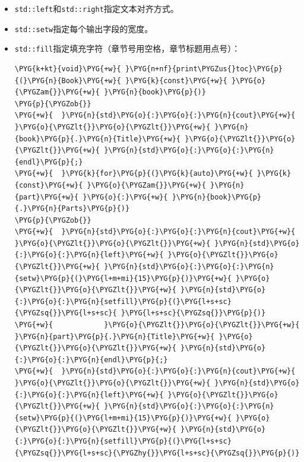 \begin{itemize}
\item \texttt{std::\allowbreak{}left}和\texttt{std::\allowbreak{}right}指定文本对齐方式。



\item \texttt{std::\allowbreak{}setw}指定每个输出字段的宽度。



\item \texttt{std::\allowbreak{}fill}指定填充字符（章节号用空格，章节标题用点号）：



\begin{codeblockbg}
\begin{Verbatim}[commandchars=\\\{\},breaklines=true,breakanywhere=true,fontsize=\codefont,xleftmargin=17bp]
\PYG{k+kt}{void}\PYG{+w}{ }\PYG{n+nf}{print\PYGZus{}toc}\PYG{p}{(}\PYG{n}{Book}\PYG{+w}{ }\PYG{k}{const}\PYG{+w}{ }\PYG{o}{\PYGZam{}}\PYG{+w}{ }\PYG{n}{book}\PYG{p}{)}
\PYG{p}{\PYGZob{}}
\PYG{+w}{  }\PYG{n}{std}\PYG{o}{:}\PYG{o}{:}\PYG{n}{cout}\PYG{+w}{ }\PYG{o}{\PYGZlt{}}\PYG{o}{\PYGZlt{}}\PYG{+w}{ }\PYG{n}{book}\PYG{p}{.}\PYG{n}{Title}\PYG{+w}{ }\PYG{o}{\PYGZlt{}}\PYG{o}{\PYGZlt{}}\PYG{+w}{ }\PYG{n}{std}\PYG{o}{:}\PYG{o}{:}\PYG{n}{endl}\PYG{p}{;}
\PYG{+w}{  }\PYG{k}{for}\PYG{p}{(}\PYG{k}{auto}\PYG{+w}{ }\PYG{k}{const}\PYG{+w}{ }\PYG{o}{\PYGZam{}}\PYG{+w}{ }\PYG{n}{part}\PYG{+w}{ }\PYG{o}{:}\PYG{+w}{ }\PYG{n}{book}\PYG{p}{.}\PYG{n}{Parts}\PYG{p}{)}
\PYG{p}{\PYGZob{}}
\PYG{+w}{  }\PYG{n}{std}\PYG{o}{:}\PYG{o}{:}\PYG{n}{cout}\PYG{+w}{ }\PYG{o}{\PYGZlt{}}\PYG{o}{\PYGZlt{}}\PYG{+w}{ }\PYG{n}{std}\PYG{o}{:}\PYG{o}{:}\PYG{n}{left}\PYG{+w}{ }\PYG{o}{\PYGZlt{}}\PYG{o}{\PYGZlt{}}\PYG{+w}{ }\PYG{n}{std}\PYG{o}{:}\PYG{o}{:}\PYG{n}{setw}\PYG{p}{(}\PYG{l+m+mi}{15}\PYG{p}{)}\PYG{+w}{ }\PYG{o}{\PYGZlt{}}\PYG{o}{\PYGZlt{}}\PYG{+w}{ }\PYG{n}{std}\PYG{o}{:}\PYG{o}{:}\PYG{n}{setfill}\PYG{p}{(}\PYG{l+s+sc}{\PYGZsq{}}\PYG{l+s+sc}{ }\PYG{l+s+sc}{\PYGZsq{}}\PYG{p}{)}
\PYG{+w}{            }\PYG{o}{\PYGZlt{}}\PYG{o}{\PYGZlt{}}\PYG{+w}{ }\PYG{n}{part}\PYG{p}{.}\PYG{n}{Title}\PYG{+w}{ }\PYG{o}{\PYGZlt{}}\PYG{o}{\PYGZlt{}}\PYG{+w}{ }\PYG{n}{std}\PYG{o}{:}\PYG{o}{:}\PYG{n}{endl}\PYG{p}{;}
\PYG{+w}{  }\PYG{n}{std}\PYG{o}{:}\PYG{o}{:}\PYG{n}{cout}\PYG{+w}{ }\PYG{o}{\PYGZlt{}}\PYG{o}{\PYGZlt{}}\PYG{+w}{ }\PYG{n}{std}\PYG{o}{:}\PYG{o}{:}\PYG{n}{left}\PYG{+w}{ }\PYG{o}{\PYGZlt{}}\PYG{o}{\PYGZlt{}}\PYG{+w}{ }\PYG{n}{std}\PYG{o}{:}\PYG{o}{:}\PYG{n}{setw}\PYG{p}{(}\PYG{l+m+mi}{15}\PYG{p}{)}\PYG{+w}{ }\PYG{o}{\PYGZlt{}}\PYG{o}{\PYGZlt{}}\PYG{+w}{ }\PYG{n}{std}\PYG{o}{:}\PYG{o}{:}\PYG{n}{setfill}\PYG{p}{(}\PYG{l+s+sc}{\PYGZsq{}}\PYG{l+s+sc}{\PYGZhy{}}\PYG{l+s+sc}{\PYGZsq{}}\PYG{p}{)}

\end{Verbatim}
\end{codeblockbg}
\end{itemize}

